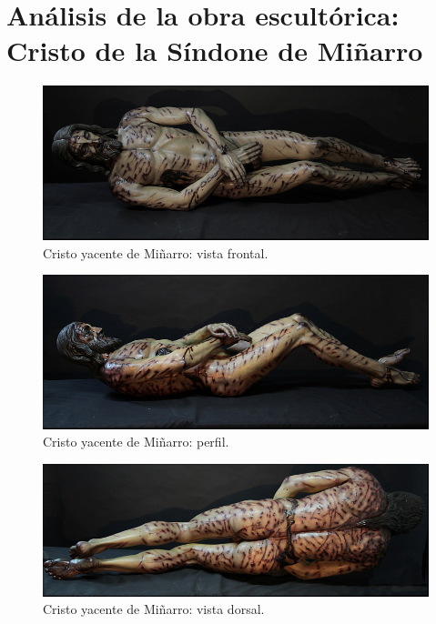 \section{Análisis de la obra escultórica: Cristo de la Síndone de Miñarro} 

\begin{figure}[ht!]
    \centering
    \includegraphics[width=1.0\textwidth]{minarro1.jpg}
    \caption{Cristo yacente de Miñarro: vista frontal.} %
\end{figure}

\begin{figure}[ht!]
    \centering
    \includegraphics[width=1.0\textwidth]{minarro2.jpg}
    \caption{Cristo yacente de Miñarro: perfil.} %
\end{figure}

\begin{figure}[ht!]
    \centering
    \includegraphics[width=1.0\textwidth]{minarro3.jpg}
    \caption{Cristo yacente de Miñarro: vista dorsal.} %
\end{figure}

